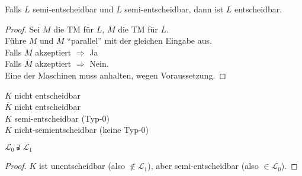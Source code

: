 \begin{Satz}[name={[{$L,\overline{L}$ semi-entscheidbar $\=> L$ entscheidbar}]},restate={[name=Wiederholung]repeatSatz613}]\label{satz:6.13}
	Falls $L$ semi-entscheidbar und $\overline{L}$ semi-entscheidbar, dann ist $L$ entscheidbar.
\end{Satz}
\begin{proof}
	Sei $M$ die \ac{TM} für $L$, $\overline{M}$ die \ac{TM} für $\overline{L}$.\\
	Führe $M$ und $\overline{M}$ "`parallel"' mit der gleichen Eingabe aus.\\
	Falls $M$ akzeptiert $\Rightarrow$ Ja\\
	Falls $\overline{M}$ akzeptiert $\Rightarrow$ Nein.\\
	Eine der Maschinen muss anhalten, wegen Voraussetzung.
\end{proof}
$K$ \quad nicht entscheidbar\\
$\overline{K}$ \quad nicht entscheidbar\\
$K$ \quad semi-entscheidbar (Typ-0)\\
$\overline{K}$ \quad nicht-semientscheidbar (keine Typ-0)
\begin{Korollar}
	$\mathcal{L}_0 \supsetneqq \mathcal{L}_1$
\end{Korollar}
\begin{proof}
	$K$ ist unentscheidbar (also $\notin \mathcal{L}_1$), aber semi-entscheidbar (also $\in \mathcal{L}_0$).
\end{proof}
